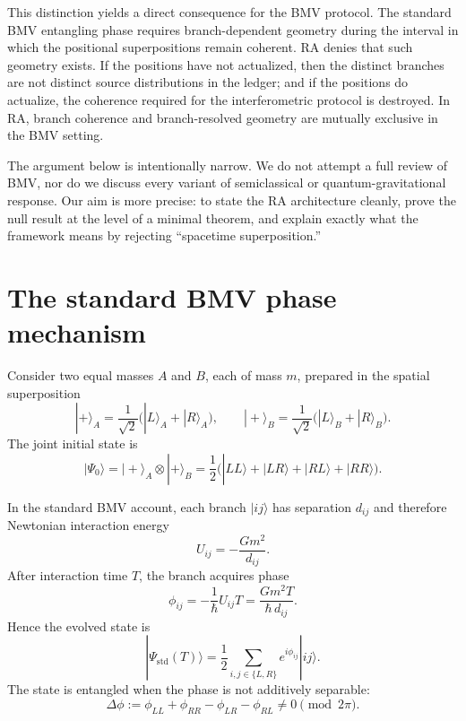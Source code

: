 \documentclass[11pt]{article}
\begin{document}
This distinction yields a direct consequence for the BMV protocol. The standard BMV entangling phase requires branch-dependent geometry during the interval in which the positional superpositions remain coherent. RA denies that such geometry exists. If the positions have not actualized, then the distinct branches are not distinct source distributions in the ledger; and if the positions do actualize, the coherence required for the interferometric protocol is destroyed. In RA, branch coherence and branch-resolved geometry are mutually exclusive in the BMV setting.

The argument below is intentionally narrow. We do not attempt a full review of BMV, nor do we discuss every variant of semiclassical or quantum-gravitational response. Our aim is more precise: to state the RA architecture cleanly, prove the null result at the level of a minimal theorem, and explain exactly what the framework means by rejecting ``spacetime superposition.''

\section{The standard BMV phase mechanism}

Consider two equal masses $A$ and $B$, each of mass $m$, prepared in the spatial superposition
\begin{equation}
|+\rangle_A = \frac{1}{\sqrt{2}}\bigl(|L\rangle_A + |R\rangle_A\bigr),
\qquad
|+\rangle_B = \frac{1}{\sqrt{2}}\bigl(|L\rangle_B + |R\rangle_B\bigr).
\end{equation}
The joint initial state is
\begin{equation}
|\Psi_0\rangle
=
|+\rangle_A \otimes |+\rangle_B
=
\frac{1}{2}\bigl(|LL\rangle + |LR\rangle + |RL\rangle + |RR\rangle\bigr).
\end{equation}

In the standard BMV account, each branch $|ij\rangle$ has separation $d_{ij}$ and therefore Newtonian interaction energy
\begin{equation}
U_{ij} = -\frac{Gm^2}{d_{ij}}.
\end{equation}
After interaction time $T$, the branch acquires phase
\begin{equation}
\phi_{ij} = -\frac{1}{\hbar} U_{ij} T = \frac{Gm^2 T}{\hbar\, d_{ij}}.
\end{equation}
Hence the evolved state is
\begin{equation}
|\Psi_{\mathrm{std}}(T)\rangle
=
\frac{1}{2}\sum_{i,j\in\{L,R\}} e^{i\phi_{ij}} |ij\rangle.
\end{equation}
The state is entangled when the phase is not additively separable:
\begin{equation}
\Delta\phi
:=
\phi_{LL} + \phi_{RR} - \phi_{LR} - \phi_{RL}
\neq 0 \pmod{2\pi}.
\end{equation}
\end{document}
